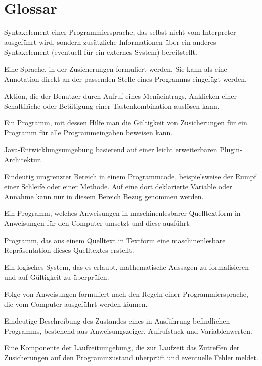 \section{Glossar}
\newcommand{\glossaritem}[1]{\item[#1]}


\begin{description}
    \label{Zusicherung}
    \glossaritem{Annotation} Syntaxelement einer Programmiersprache, das selbst nicht vom Interpreter ausgeführt wird, sondern zusätzliche Informationen über ein anderes Syntaxelement (eventuell für ein externes System) bereitstellt.
    \glossaritem{Annotationssprache (Beweiser)} Eine Sprache, in der Zusicherungen formuliert werden. Sie kann als eine Annotation direkt an der passenden Stelle eines Programms eingefügt werden.
    \glossaritem{Befehl~(GUI)} Aktion, die der Benutzer durch Aufruf eines Menüeintrags, Anklicken einer Schaltfläche oder Betätigung einer Tastenkombination auslösen kann.
    \glossaritem{Beweiser} Ein Programm, mit dessen Hilfe man die Gültigkeit von Zusicherungen für ein Programm für alle Programmeingaben beweisen kann.
    \glossaritem{Eclipse} Java-Entwicklungsumgebung basierend auf einer leicht erweiterbaren Plugin-Architektur.
    \glossaritem{Gültigkeitsbereich} Eindeutig umgrenzter Bereich in einem Programmcode, beispielsweise der Rumpf einer Schleife oder einer Methode. Auf eine dort deklarierte Variable oder Annahme kann nur in diesem Bereich Bezug genommen werden.
    \glossaritem{Interpreter} Ein Programm, welches Anweisungen in maschinenlesbarer Quelltextform in Anweisungen für den Computer umsetzt und diese ausführt.
    \glossaritem{Parser} Programm, das aus einem Quelltext in Textform eine maschinenlesbare Repräsentation dieses Quelltextes erstellt.
    \glossaritem{Prädikatenlogik} Ein logisches System, das es erlaubt, mathematische Aussagen zu formalisieren und auf Gültigkeit zu überprüfen. %
    \glossaritem{Programm} Folge von Anweisungen formuliert nach den Regeln einer Programmiersprache, die vom Computer ausgeführt werden können.
    \glossaritem{Programmzustand} Eindeutige Beschreibung des Zustandes eines in Ausführung befindlichen Programms, bestehend aus Anweisungszeiger, Aufrufstack und Variablenwerten.
    \glossaritem{Run-time-checker} Eine Komponente der Laufzeitumgebung, die zur Laufzeit das Zutreffen der Zusicherungen auf den Programmzustand überprüft und eventuelle Fehler meldet.

\end{description}
